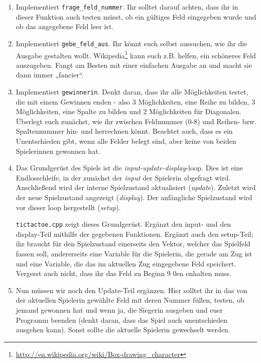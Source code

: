 \begin{praxis}
	\begin{enumerate}
    \item Implementiert \texttt{frage\_feld\_nummer}. Ihr solltet darauf
          achten, dass ihr in dieser Funktion auch testen müsst, ob ein gültiges
          Feld eingegeben wurde und ob das angegebene Feld leer ist.

    \item Implementiert \texttt{gebe\_feld\_aus}. Ihr könnt euch selbst
          aussuchen, wie ihr die Ausgabe gestalten wollt.
          Wikipedia\footnote{\url{http://en.wikipedia.org/wiki/Box-drawing_character}}
          kann euch z.B. helfen, ein schöneres Feld auszugeben. Fangt am Besten
          mit einer einfachen Ausgabe an und macht sie dann immer „fancier“.

    \item Implementiert \texttt{gewinnerin}. Denkt daran, dass ihr alle
          Möglichkeiten testet, die mit einem Gewinnen enden - also 3
          Möglichkeiten, eine Reihe zu bilden, 3 Möglichkeiten, eine Spalte zu
          bilden und 2 Möglichkeiten für Diagonalen. Überlegt euch zunächst, wie
          ihr zwischen Feldnummer (0-8) und Reihen- bzw. Spaltennummer hin- und
          herrechnen könnt. Beachtet auch, dass es ein Unentschieden gibt, wenn
          alle Felder belegt sind, aber keine von beiden Spielerinnen gewonnen
          hat.
    \item
		      Das Grundgerüst des Spiels ist die \emph{input-update-display}-loop.
		      Dies ist eine Endlosschleife, in der zunächst der \emph{input} der Spielerin abgefragt wird.
		      Anschließend wird der interne Spielzustand aktualisiert (\emph{update}).
		      Zuletzt wird der neue Spielzustand angezeigt (\emph{display}).
		      Der anfängliche Spielzustand wird vor dieser loop hergestellt (\emph{setup}).

		      \texttt{tictactoe.cpp} zeigt dieses Grundgerüst.
		      Ergänzt den input- und den display-Teil mithilfe der gegebenen Funktionen.
		      Ergänzt auch den setup-Teil; ihr braucht für den Spielzustand einerseits den Vektor, welcher das Spielfeld fassen soll, andererseits eine Variable für die Spielerin, die gerade am Zug ist und eine Variable, die das im aktuellen Zug eingegebene Feld speichert.
		      Vergesst auch nicht, dass ihr das Feld zu Beginn 9 0en enhalten muss.
		\item
		      Nun müssen wir noch den Update-Teil ergänzen.
		      Hier solltet ihr in das von der aktuellen Spielerin gewählte Feld mit deren Nummer füllen, testen, ob jemand gewonnen hat und wenn ja, die Siegerin ausgeben und euer Programm beenden (denkt daran, dass das Spiel auch unentschieden ausgehen kann).
		      Sonst sollte die aktuelle Spielerin gewechselt werden.
	\end{enumerate}
\end{praxis}

